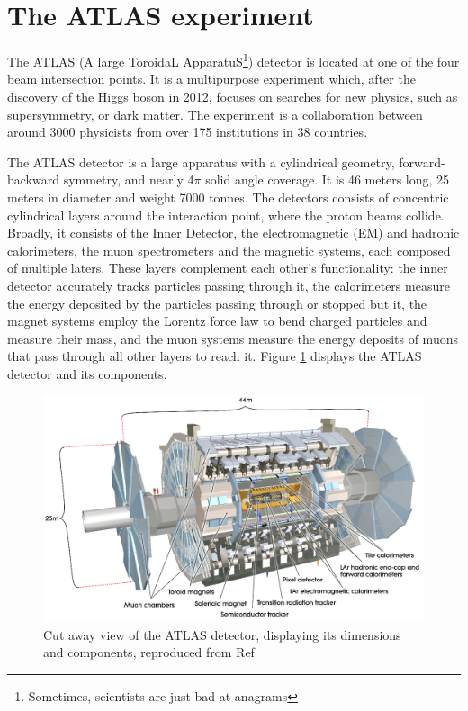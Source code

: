 \documentclass[11pt,a4paper,openright,twoside]{report}
\begin{document}
\section{The ATLAS experiment}
The ATLAS (A large ToroidaL ApparatuS\footnote{Sometimes, scientists are just bad at anagrams}) detector is located at one of the four beam intersection points. It is a multipurpose experiment which, after the discovery of the Higgs boson in 2012, focuses on searches for new physics, such as supersymmetry, or dark matter. The experiment is a collaboration between around 3000 physicists from over 175 institutions in 38 countries.

The ATLAS detector is a large apparatus with a cylindrical geometry, forward-backward symmetry, and nearly 4$\pi$ solid angle coverage. It is 46 meters long, 25 meters in diameter and weight 7000 tonnes. The detectors consists of concentric cylindrical layers around the interaction point, where the proton beams collide. Broadly, it consists of the  Inner Detector, the electromagnetic (EM) and hadronic calorimeters, the muon spectrometers and the magnetic systems, each composed of multiple laters. These layers complement each other's functionality: the inner detector accurately tracks particles passing through it, the calorimeters measure the energy deposited by the particles passing through or stopped but it, the magnet systems employ the Lorentz force law to bend charged particles and measure their mass, and the muon systems measure the energy deposits of muons that pass through all other layers to reach it. Figure \ref{fig:ATLAS} displays the ATLAS detector and its components.

\begin{figure}[H]
\centering
\includegraphics[width=\textwidth]{ATLAS.png}
\caption{Cut away view of the ATLAS detector, displaying its dimensions and components, reproduced from Ref \cite{ATLAS_detector}}
\label{fig:ATLAS}
\end{figure}
\end{document}
